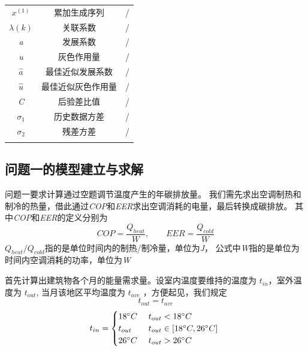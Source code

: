 \documentclass[a4paper, 12pt]{article}
\numberwithin{equation}{section}
\begin{document}
\begin{table}[htbp]
\begin{tabular}{c c c}
                $ x^{ (1)} $ & 累加生成序列 & / \\
                $ \lambda (k) $ & 关联系数 & / \\
                \textit{a} & 发展系数 & / \\
                \textit{u} & 灰色作用量 & / \\
                $ \hat{a} $ & 最佳近似发展系数 & / \\
                $ \hat{u} $ & 最佳近似灰色作用量 & / \\
                \textit{C} & 后验差比值 & / \\
                $ \sigma _{1} $ & 历史数据方差 & / \\
                $ \sigma _{2} $ & 残差方差 & / \\
                \noalign{\smallskip} \hline \noalign{\smallskip}
            \end{tabular}
        \end{table}


    {}
        \subsection{问题一的模型建立与求解}
            问题一要求计算通过空题调节温度产生的年碳排放量。
            我们需先求出空调制热和制冷的热量，借此通过\textit{COP}和\textit{EER}求出空调消耗的电量，最后转换成碳排放。
            其中\textit{COP}和\textit{EER}的定义分别为
            \begin{equation}
                COP = \frac{Q_{heat}}{W},\hspace{2em} EER = \frac{Q_{cold}}{W}
            \end{equation}
            $ Q_{heat} / Q_{cold} $指的是单位时间内的制热/制冷量，单位为\textit{J}，
            公式中\textit{W}指的是单位为时间内空调消耗的功率，单位为\textit{W}

            首先计算出建筑物各个月的能量需求量。设室内温度要维持的温度为 $ t_{in} $，室外温度为 $ t_{out} $,
            当月该地区平均温度为 $ t_{ave} $ ，方便起见，我们规定
            \begin{equation*}
                t_{out} = t_{ave}
            \end{equation*}
            \begin{equation*}
                t_{in} =
                \begin{cases}
                    18 ^{\circ}C & \text{ $ t_{out} < 18 ^{\circ}C $ } \\
                    t_{out} & \text{ $ t_{out} \in [18 ^{\circ}C, 26 ^{\circ}C] $ } \\
                    26 ^{\circ}C & \text{ $ t_{out} > 26 ^{\circ}C $}
                \end{cases}
            \end{equation*}
\end{document}
